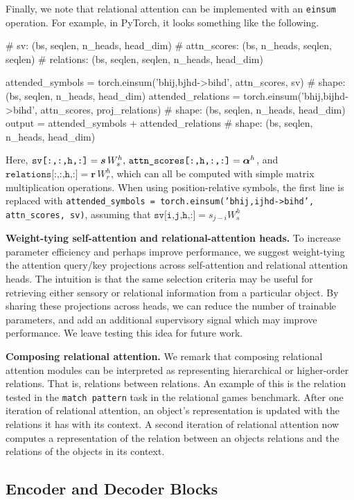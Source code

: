 Finally, we note that relational attention can be implemented with an \texttt{einsum} operation. For example, in PyTorch, it looks something like the following.
\begin{python}
# sv: (bs, seqlen, n_heads, head_dim)
# attn_scores: (bs, n_heads, seqlen, seqlen)
# relations: (bs, seqlen, seqlen, n_heads, head_dim)

attended_symbols = torch.einsum('bhij,bjhd->bihd', attn_scores, sv)
# shape: (bs, seqlen, n_heads, head_dim)
attended_relations = torch.einsum('bhij,bijhd->bihd', attn_scores, proj_relations)
# shape: (bs, seqlen, n_heads, head_dim)
output = attended_symbols + attended_relations
# shape: (bs, seqlen, n_heads, head_dim)
\end{python}

Here, $\texttt{sv[:,:,h,:]} = \bm{s} \,W_s^h,\, \texttt{attn\_scores[:,h,:,:]} = \bm{\alpha}^h$, and $\texttt{relations[:,:,h,:]} = \bm{r} \, W_r^h$, which can all be computed with simple matrix multiplication operations. When using position-relative symbols, the first line is replaced with \texttt{attended\_symbols = torch.einsum('bhij,ijhd->bihd', attn\_scores, sv)}, assuming that $\texttt{sv[i,j,h,:]} = s_{j-i} W_s^h$

\textbf{Weight-tying self-attention and relational-attention heads.} To increase parameter efficiency and perhaps improve performance, we suggest weight-tying the attention query/key projections across self-attention and relational attention heads. The intuition is that the same selection criteria may be useful for retrieving either sensory or relational information from a particular object. By sharing these projections across heads, we can reduce the number of trainable parameters, and add an additional supervisory signal which may improve performance. We leave testing this idea for future work.

\textbf{Composing relational attention.} We remark that composing relational attention modules can be interpreted as representing hierarchical or higher-order relations. That is, relations between relations. An example of this is the relation tested in the \texttt{match pattern} task in the relational games benchmark. After one iteration of relational attention, an object's representation is updated with the relations it has with its context. A second iteration of relational attention now computes a representation of the relation between an objects relations and the relations of the objects in its context.

\subsection{Encoder and Decoder Blocks}

